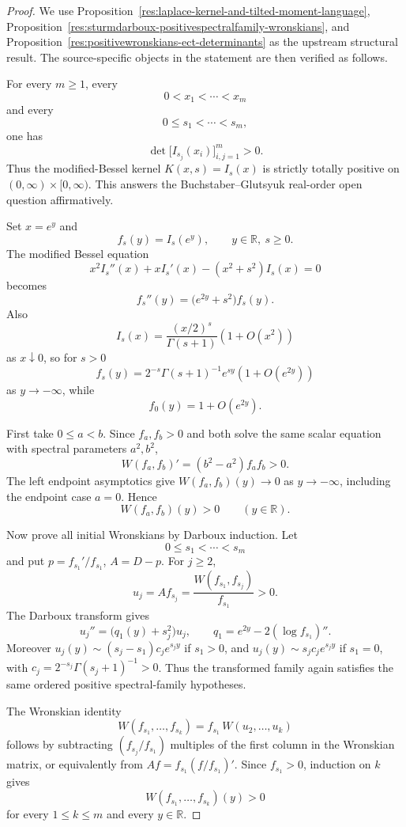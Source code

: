 \documentclass[11pt]{article}
\numberwithin{equation}{section}
\theoremstyle{definition}
\theoremstyle{remark}
\newcommand{\1}{\mathbf 1}
\begin{document}
\begin{proof}
We use Proposition~\ref{res:laplace-kernel-and-tilted-moment-language}, Proposition~\ref{res:sturmdarboux-positivespectralfamily-wronskians}, and Proposition~\ref{res:positivewronskians-ect-determinants} as the upstream structural result. The source-specific objects in the statement are then verified as follows.

For every \(m\ge 1\), every
\[
0<x_1<\cdots<x_m
\]
and every
\[
0\le s_1<\cdots<s_m,
\]
one has
\[
\det\big[I_{s_j}(x_i)\big]_{i,j=1}^m>0.
\]
Thus the modified-Bessel kernel \(K(x,s)=I_s(x)\) is strictly totally positive on \((0,\infty)\times[0,\infty)\). This answers the Buchstaber--Glutsyuk real-order open question affirmatively.

Set \(x=e^y\) and
\[
f_s(y)=I_s(e^y),\qquad y\in\mathbb R,\ s\ge0.
\]
The modified Bessel equation
\[
x^2I_s''(x)+xI_s'(x)-(x^2+s^2)I_s(x)=0
\]
becomes
\[
f_s''(y)=\big(e^{2y}+s^2\big)f_s(y).
\]
Also
\[
I_s(x)=\frac{(x/2)^s}{\Gamma(s+1)}(1+O(x^2))
\]
as \(x\downarrow0\), so for \(s>0\)
\[
f_s(y)=2^{-s}\Gamma(s+1)^{-1}e^{sy}(1+O(e^{2y}))
\]
as \(y\to-\infty\), while
\[
f_0(y)=1+O(e^{2y}).
\]

First take \(0\le a<b\). Since \(f_a,f_b>0\) and both solve the same scalar equation with spectral parameters \(a^2,b^2\),
\[
W(f_a,f_b)'=(b^2-a^2)f_af_b>0.
\]
The left endpoint asymptotics give \(W(f_a,f_b)(y)\to0\) as \(y\to-\infty\), including the endpoint case \(a=0\). Hence
\[
W(f_a,f_b)(y)>0\qquad (y\in\mathbb R).
\]

Now prove all initial Wronskians by Darboux induction. Let
\[
0\le s_1<\cdots<s_m
\]
and put \(p=f_{s_1}'/f_{s_1}\), \(A=D-p\). For \(j\ge2\),
\[
u_j=Af_{s_j}=\frac{W(f_{s_1},f_{s_j})}{f_{s_1}}>0.
\]
The Darboux transform gives
\[
u_j''=\big(q_1(y)+s_j^2\big)u_j,\qquad
q_1=e^{2y}-2(\log f_{s_1})''.
\]
Moreover \(u_j(y)\sim (s_j-s_1)c_j e^{s_jy}\) if \(s_1>0\), and \(u_j(y)\sim s_jc_je^{s_jy}\) if \(s_1=0\), with \(c_j=2^{-s_j}\Gamma(s_j+1)^{-1}>0\). Thus the transformed family again satisfies the same ordered positive spectral-family hypotheses.

The Wronskian identity
\[
W(f_{s_1},\ldots,f_{s_k})=f_{s_1}\,W(u_2,\ldots,u_k)
\]
follows by subtracting \((f_{s_j}/f_{s_1})\) multiples of the first column in the Wronskian matrix, or equivalently from \(Af=f_{s_1}(f/f_{s_1})'\). Since \(f_{s_1}>0\), induction on \(k\) gives
\[
W(f_{s_1},\ldots,f_{s_k})(y)>0
\]
for every \(1\le k\le m\) and every \(y\in\mathbb R\).


\end{proof}
\end{document}
